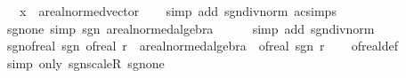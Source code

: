 \begin{isabellebody}
\ \ \ x\ {\isacharcolon}{\kern0pt}{\isacharcolon}{\kern0pt}\ {\isachardoublequoteopen}{\isacharprime}{\kern0pt}a{\isacharcolon}{\kern0pt}{\isacharcolon}{\kern0pt}real{\isacharunderscore}{\kern0pt}normed{\isacharunderscore}{\kern0pt}vector{\isachardoublequoteclose}\isanewline
%
\isadelimproof
\ \ %
\endisadelimproof
%
\isatagproof
{}\isamarkupfalse%
\ {\isacharparenleft}{\kern0pt}simp\ add{\isacharcolon}{\kern0pt}\ sgn{\isacharunderscore}{\kern0pt}div{\isacharunderscore}{\kern0pt}norm\ ac{\isacharunderscore}{\kern0pt}simps{\isacharparenright}{\kern0pt}%
\endisatagproof
{\isafoldproof}%
%
\isadelimproof
\isanewline
%
\endisadelimproof
\isanewline
{}\isamarkupfalse%
\ sgn{\isacharunderscore}{\kern0pt}one\ {\isacharbrackleft}{\kern0pt}simp{\isacharbrackright}{\kern0pt}{\isacharcolon}{\kern0pt}\ {\isachardoublequoteopen}sgn\ {\isacharparenleft}{\kern0pt}{}{\isacharcolon}{\kern0pt}{\isacharcolon}{\kern0pt}{\isacharprime}{\kern0pt}a{\isacharcolon}{\kern0pt}{\isacharcolon}{\kern0pt}real{\isacharunderscore}{\kern0pt}normed{\isacharunderscore}{\kern0pt}algebra{\isacharunderscore}{\kern0pt}{}{\isacharparenright}{\kern0pt}\ {\isacharequal}{\kern0pt}\ {}{\isachardoublequoteclose}\isanewline
%
\isadelimproof
\ \ %
\endisadelimproof
%
\isatagproof
{}\isamarkupfalse%
\ {\isacharparenleft}{\kern0pt}simp\ add{\isacharcolon}{\kern0pt}\ sgn{\isacharunderscore}{\kern0pt}div{\isacharunderscore}{\kern0pt}norm{\isacharparenright}{\kern0pt}%
\endisatagproof
{\isafoldproof}%
%
\isadelimproof
\isanewline
%
\endisadelimproof
\isanewline
{}\isamarkupfalse%
\ sgn{\isacharunderscore}{\kern0pt}of{\isacharunderscore}{\kern0pt}real{\isacharcolon}{\kern0pt}\ {\isachardoublequoteopen}sgn\ {\isacharparenleft}{\kern0pt}of{\isacharunderscore}{\kern0pt}real\ r\ {\isacharcolon}{\kern0pt}{\isacharcolon}{\kern0pt}\ {\isacharprime}{\kern0pt}a{\isacharcolon}{\kern0pt}{\isacharcolon}{\kern0pt}real{\isacharunderscore}{\kern0pt}normed{\isacharunderscore}{\kern0pt}algebra{\isacharunderscore}{\kern0pt}{}{\isacharparenright}{\kern0pt}\ {\isacharequal}{\kern0pt}\ of{\isacharunderscore}{\kern0pt}real\ {\isacharparenleft}{\kern0pt}sgn\ r{\isacharparenright}{\kern0pt}{\isachardoublequoteclose}\isanewline
%
\isadelimproof
\ \ %
\endisadelimproof
%
\isatagproof
{}\isamarkupfalse%
\ of{\isacharunderscore}{\kern0pt}real{\isacharunderscore}{\kern0pt}def\ \isamarkupfalse%
\ {\isacharparenleft}{\kern0pt}simp\ only{\isacharcolon}{\kern0pt}\ sgn{\isacharunderscore}{\kern0pt}scaleR\ sgn{\isacharunderscore}{\kern0pt}one{\isacharparenright}{\kern0pt}%

\end{isabellebody}
